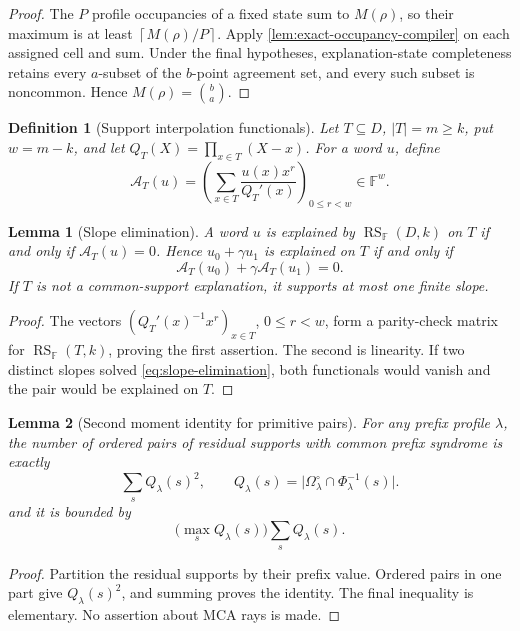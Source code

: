 \documentclass[12pt,a4paper]{amsart}
\numberwithin{equation}{section}
\newtheorem{lemma}[lemma]{Lemma}
\newtheorem{definition}[definition]{Definition}
\theoremstyle{remark}
\DeclareMathOperator{\RS}{RS}
\newcommand{\F}{\mathbb F}
\newcommand{\Omc}{\Omega^{\circ}}
\newcommand{\abs}[1]{\lvert #1\rvert}
\newcommand{\ceil}[1]{\left\lceil #1\right\rceil}
\begin{document}
\begin{proof}
The \(P\) profile occupancies of a fixed state sum to \(M(\rho)\), so
their maximum is at least \(\ceil{M(\rho)/P}\).  Apply
\cref{lem:exact-occupancy-compiler} on each assigned cell and sum.  Under
the final hypotheses, explanation-state completeness retains every
\(a\)-subset of the \(b\)-point agreement set, and every such subset is
noncommon.  Hence \(M(\rho)=\binom ba\).
\end{proof}

\begin{definition}[Support interpolation functionals]
\label{def:pair-to-ray-map}
Let \(T\subseteq D\), \(\abs T=m\ge k\), put \(w=m-k\), and let
\(Q_T(X)=\prod_{x\in T}(X-x)\).  For a word \(u\), define
\[
 \mathcal A_T(u)=
 \left(
   \sum_{x\in T}\frac{u(x)x^r}{Q_T'(x)}
 \right)_{0\le r<w}\in\F^w.
 \tag{12.1}\label{eq:interpolation-functional}
\]
\end{definition}

\begin{lemma}[Slope elimination]\label{lem:saturation-quotient-rays}
A word \(u\) is explained by \(\RS_\F(D,k)\) on \(T\) if and only if
\(\mathcal A_T(u)=0\).  Hence \(u_0+\gamma u_1\) is explained on \(T\)
if and only if
\[
 \mathcal A_T(u_0)+\gamma\mathcal A_T(u_1)=0.
 \tag{12.2}\label{eq:slope-elimination}
\]
If \(T\) is not a common-support explanation, it supports at most one
finite slope.
\end{lemma}

\begin{proof}
The vectors \((Q_T'(x)^{-1}x^r)_{x\in T}\), \(0\le r<w\), form a
parity-check matrix for \(\RS_\F(T,k)\), proving the first assertion.  The
second is linearity.  If two distinct slopes solved
\eqref{eq:slope-elimination}, both functionals would vanish and the pair
would be explained on \(T\).
\end{proof}

\begin{lemma}[Second moment identity for primitive pairs]\label{lem:second-moment-identity}
For any prefix profile \(\lambda\), the number of ordered pairs of residual
supports with common prefix syndrome is exactly
\[
        \sum_s Q_\lambda(s)^2,
        \qquad
        Q_\lambda(s)=\abs{\Omc_\lambda\cap\Phi_\lambda^{-1}(s)}.
\]
and it is bounded by
\[
        \bigl(\max_sQ_\lambda(s)\bigr)\sum_sQ_\lambda(s).
\]
\end{lemma}

\begin{proof}
Partition the residual supports by their prefix value.  Ordered pairs in one
part give \(Q_\lambda(s)^2\), and summing proves the identity.  The final
inequality is elementary.  No assertion about MCA rays is made.
\end{proof}
\end{document}
